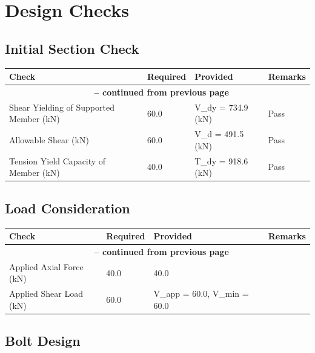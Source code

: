 \documentclass[12pt]{article}
\begin{document}
\FloatBarrier

\section{Design Checks}

\FloatBarrier

\subsection{Initial Section Check}

\begin{longtable}{llll}
\cellcolor{OsdagGreen} Check & \cellcolor{OsdagGreen} Required & \cellcolor{OsdagGreen} Provided & \cellcolor{OsdagGreen} Remarks \\ \hline
\endfirsthead
\multicolumn{4}{c}{{\bfseries \tablename\ \thetable{} -- continued from previous page}} \\
\endhead
\endfoot
\endlastfoot
Shear Yielding of Supported Member (kN) & 60.0 & V\_dy = 734.9 (kN) & Pass \\
\hline
Allowable Shear (kN) & 60.0 & V\_d = 491.5 (kN) & Pass \\
\hline
Tension Yield Capacity of Member (kN) & 40.0 & T\_dy = 918.6 (kN) & Pass \\
\hline
\end{longtable}

\FloatBarrier

\subsection{Load Consideration}

\begin{longtable}{llll}
\cellcolor{OsdagGreen} Check & \cellcolor{OsdagGreen} Required & \cellcolor{OsdagGreen} Provided & \cellcolor{OsdagGreen} Remarks \\ \hline
\endfirsthead
\multicolumn{4}{c}{{\bfseries \tablename\ \thetable{} -- continued from previous page}} \\
\endhead
\endfoot
\endlastfoot
Applied Axial Force (kN) & 40.0 & 40.0 &  \\
\hline
Applied Shear Load (kN) & 60.0 & V\_app = 60.0, V\_min = 60.0 &  \\
\hline
\end{longtable}

\FloatBarrier

\subsection{Bolt Design}
\end{document}
